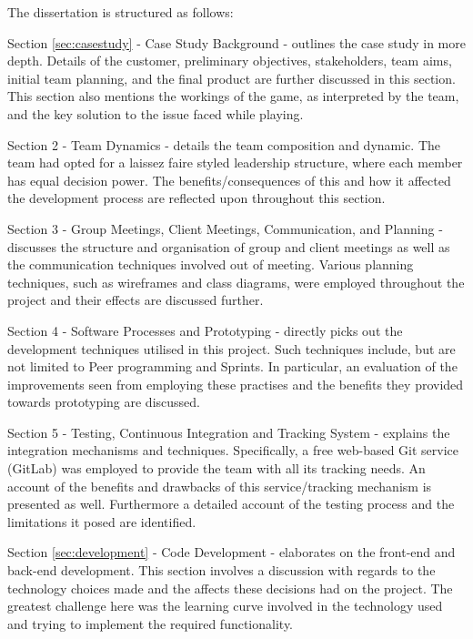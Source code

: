 \documentclass{l3proj}
\begin{document}
The dissertation is structured as follows:

Section \ref{sec:casestudy} - Case Study Background - outlines the case study in more depth. Details of the customer, preliminary objectives, stakeholders, team aims, initial team planning, and the final product are further discussed in this section. This section also mentions the workings of the game, as interpreted by the team, and the key solution to the issue faced while playing.

Section 2 -  Team Dynamics - details the team composition and dynamic. The team had opted for a laissez faire styled leadership structure, where each member has equal decision power. The benefits/consequences of this and how it affected the development process are reflected upon throughout this section.

Section 3 - Group Meetings, Client Meetings, Communication, and Planning - discusses the structure and organisation of group and client meetings as well as the communication techniques involved out of meeting. Various planning techniques, such as wireframes and class diagrams, were employed throughout the project and their effects are discussed further.

Section 4 - Software Processes and Prototyping - directly picks out the development techniques utilised in this project. Such techniques include, but are not limited to Peer programming and Sprints. In particular, an evaluation of the improvements seen from employing these practises and the benefits they provided towards prototyping are discussed.

Section 5 - Testing, Continuous Integration and Tracking System - explains the integration mechanisms and techniques. Specifically, a free web-based Git service (GitLab) was employed to provide the team with all its tracking needs. An account of the benefits and drawbacks of this service/tracking mechanism is presented as well. Furthermore a detailed account of the testing process and the limitations it posed are identified.

Section \ref{sec:development} - Code Development - elaborates on the front-end and back-end development. This section involves a discussion with regards to the technology choices made and the affects these decisions had on the project. The greatest challenge here was the learning curve involved in the technology used and trying to implement the required functionality.

\end{document}
